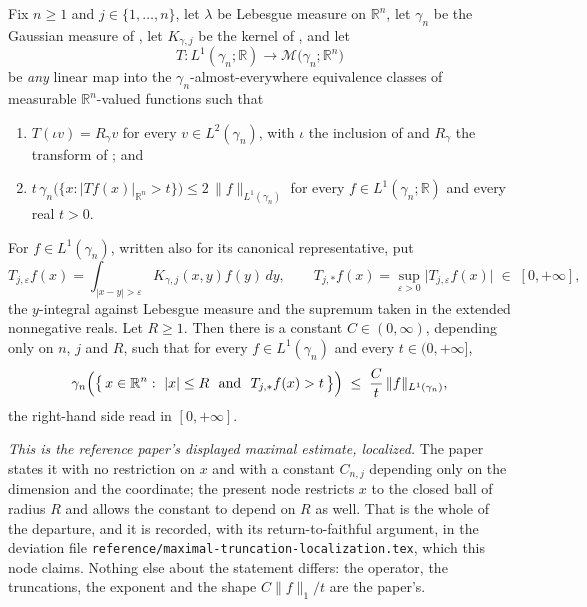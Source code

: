 \begin{lemma}
Fix $n \geq 1$ and $j \in \{1,\ldots,n\}$, let $\lambda$ be Lebesgue measure on
$\mathbb{R}^n$, let $\gamma_n$ be the Gaussian measure of
, let $K_{\gamma,j}$ be the kernel of
, and let
\[
  T : L^1(\gamma_n;\mathbb{R}) \longrightarrow
      \mathcal{M}\bigl(\gamma_n;\mathbb{R}^n\bigr)
\]
be \emph{any} linear map into the $\gamma_n$-almost-everywhere equivalence
classes of measurable $\mathbb{R}^n$-valued functions such that
\begin{enumerate}
\item[(T1)] $T(\iota v) = R_\gamma v$ for every $v \in L^2(\gamma_n)$, with
$\iota$ the inclusion of  and $R_\gamma$ the transform of
; and
\item[(T2)] $t\,\gamma_n\bigl(\{x : |Tf(x)|_{\mathbb{R}^n} > t\}\bigr)
\leq 2\,\|f\|_{L^1(\gamma_n)}$ for every $f \in L^1(\gamma_n;\mathbb{R})$ and
every real $t > 0$.
\end{enumerate}
For $f \in L^1(\gamma_n)$, written also for its canonical representative, put
\[
  T_{j,\varepsilon}f(x) = \int_{|x-y|>\varepsilon}K_{\gamma,j}(x,y)f(y)\,dy ,
  \qquad
  T_{j,*}f(x) = \sup_{\varepsilon>0}\bigl|T_{j,\varepsilon}f(x)\bigr|
  \;\in\;[0,+\infty] ,
\]
the $y$-integral against Lebesgue measure and the supremum taken in the
extended nonnegative reals.  Let $R \geq 1$.  Then there is a constant
$C \in (0,\infty)$, depending only on $n$, $j$ and $R$, such that for every
$f \in L^1(\gamma_n)$ and every $t \in (0,+\infty]$,
\[
  \gamma_n\Bigl(\bigl\{\,x \in \mathbb{R}^n :\ |x| \leq R
     \ \text{ and }\ T_{j,*}f(x) > t\,\bigr\}\Bigr)
  \;\leq\; \frac{C}{t}\,\|f\|_{L^1(\gamma_n)} ,
\]
the right-hand side read in $[0,+\infty]$.

\emph{This is the reference paper's displayed maximal estimate, localized.}  The
paper states it with no restriction on $x$ and with a constant $C_{n,j}$
depending only on the dimension and the coordinate; the present node restricts
$x$ to the closed ball of radius $R$ and allows the constant to depend on $R$ as
well.  That is the whole of the departure, and it is recorded, with its
return-to-faithful argument, in the deviation file
\texttt{reference/maximal-truncation-localization.tex}, which this node claims.
Nothing else about the statement differs: the operator, the truncations, the
exponent and the shape $C\|f\|_1/t$ are the paper's.


\end{lemma}
